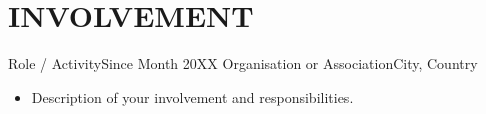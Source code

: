 \section{INVOLVEMENT}
\resumeSubHeadingListStart

\resumeSubheading
  {Role / Activity}{Since Month 20XX}
  {Organisation or Association}{City, Country}
  \begin{itemize}[leftmargin=0.12in, label={}, itemsep=0pt]
    \item \small Description of your involvement and responsibilities.
  \end{itemize}

\resumeSubHeadingListEnd
